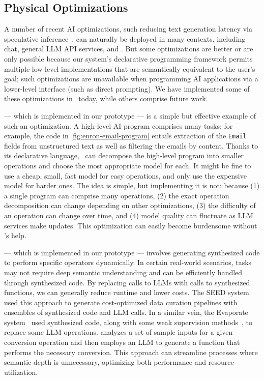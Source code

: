 \subsection{Physical Optimizations}
\label{sec:physicalopt}
A number of recent AI optimizations, such reducing text generation latency via speculative inference~\cite{liu2023online, spector2023, leviathan2023fast, chen2023accelerating}, can naturally be deployed in many contexts, including chat, general LLM API services, and \system. But some optimizations are better or are only possible because our system's declarative programming framework permits  multiple low-level implementations that are semantically equivalent to the user's goal; such optimizations are unavailable when programming AI applications via a lower-level interface (such as direct prompting). We have implemented some of these optimizations in \system\ today, while others comprise future work.


 --- which is implemented in our prototype --- is a simple but effective example of such an optimization. A high-level AI program comprises many tasks; for example, the code in \autoref{fig:enron-email-program} entails extraction of the {\tt Email} fields from unstructured text as well as filtering the emails by content. Thanks to its declarative language, \system\ can decompose the high-level program into smaller operations and choose the most appropriate model for each. It might be fine to use a cheap, small, fast model for easy operations, and only use the expensive model for harder ones. The idea is simple, but implementing it is not: because (1) a single program can comprise many operations, (2) the exact operation decomposition can change depending on other optimizations, (3) the difficulty of an operation can change over time, and (4) model quality can fluctuate as LLM services make updates. This optimization can easily become burdensome without \system's help.

 --- which is implemented in our prototype --- involves generating synthesized code to perform specific operators dynamically. In certain real-world scenarios, tasks may not require deep semantic understanding and can be efficiently handled through synthesized code. By replacing calls to LLMs with calls to synthesized functions, we can generally reduce runtime and lower costs. The SEED system \cite{chen2024seed} used this approach to generate cost-optimized data curation pipelines with ensembles of synthesized code and LLM calls. In a similar vein, the {\sc Evaporate} system~\cite{arora2023language} used synthesized code, along with some weak supervision methods~\cite{Ratner_2017}, to replace some LLM operations. \system{} analyzes a set of sample inputs for a given conversion operation and then employs an LLM to generate a function that performs the necessary conversion. This approach can streamline processes where semantic depth is unnecessary, optimizing both performance and resource utilization.

